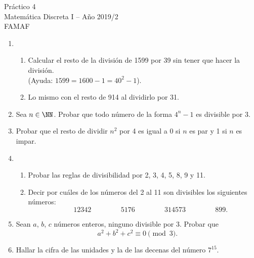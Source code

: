 \documentclass[12pt,spanish,makeidx]{amsbook}
\begin{document}
{\bf \begin{center} Práctico 4 \\ Matemática Discreta I -- Año 2019/2 \\ FAMAF \end{center}}

\smallskip


\begin{enumerate}
\item  
\begin{enumerate}
	\item Calcular el resto de la divisi\'on de 1599 por 39 sin tener que hacer la divisi\'on. \\(Ayuda: $1599=1600-1=40^2-1$).
	\item Lo mismo con el resto de 914 al dividirlo por 31.
\end{enumerate}


\smallskip
\item Sea $n\in\NN$. Probar que todo n\'umero de la forma $4^n-1$ es divisible por 3.

\smallskip
\item Probar que el resto de dividir $n^2$ por 4 es igual a 0 si $n$ es par y 1 si $n$ es impar.



\smallskip
\item
\begin{enumerate}
\item
Probar las reglas de divisibilidad por 2, 3, 4, 5, 8, 9 y 11.%
\item Decir por cu\'ales de los n\'umeros del 2 al 11 son divisibles los siguientes n\'umeros:
$$ \qquad 12342  \, \qquad   \qquad  5176 \, \qquad \qquad  314573\,  \qquad  \qquad  899.$$
\end{enumerate}


\smallskip
\item Sean $a$, $b$, $c$ n\'umeros enteros, ninguno divisible por 3. Probar que 
$$a^2 + b^2 + c^2\equiv 0 \pmod 3.$$%


\smallskip
\item Hallar la cifra de las unidades y la de las decenas del n\'umero $7^{15}$.



\end{enumerate}
\end{document}
